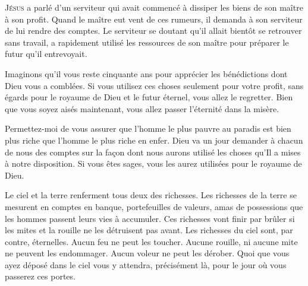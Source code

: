 

\lettrine{J}{ésus} a parlé d'un serviteur qui avait commencé
 à dissiper les biens de son maître à son profit.
 Quand le maître eut vent de ces rumeurs, il demanda à son serviteur
 de lui rendre des comptes. Le serviteur se doutant qu'il allait bientôt
 se retrouver sans travail, a rapidement utilisé les ressources
 de son maître pour préparer le futur qu'il entrevoyait.

Imaginons qu'il vous reste cinquante ans pour apprécier les bénédictions
 dont Dieu vous a comblées. Si vous utilisez ces choses seulement
 pour votre profit, sans égards pour le royaume de Dieu et le futur éternel,
 vous allez le regretter. Bien que vous soyez aisés maintenant,
 vous allez passer l'éternité dans la misère.

Permettez-moi de vous assurer que l'homme le plus pauvre au paradis
 est bien plus riche que l'homme le plus riche en enfer.
 Dieu va un jour demander à chacun de nous des comptes
 sur la fa\c{c}on dont nous aurons utilisé les choses qu'Il a mises
 à notre disposition. Si vous êtes sages,
 vous les aurez utilisées pour le royaume de Dieu.

Le ciel et la terre renferment tous deux des richesses.
 Les richesses de la terre se mesurent en comptes en banque,
 portefeuilles de valeurs, amas de possessions que les hommes passent
 leurs vies à accumuler. Ces richesses vont finir par brûler si les mites
 et la rouille ne les détruisent pas avant. Les richesses du ciel sont,
 par contre, éternelles. Aucun feu ne peut les toucher.
 Aucune rouille, ni aucune mite ne peuvent les endommager.
 Aucun voleur ne peut les dérober. Quoi que vous ayez déposé dans le ciel
 vous y attendra, précisément là, pour le jour où vous passerez ces portes.


\dvrule







